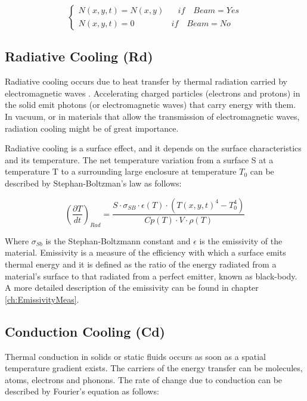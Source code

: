 \begin{equation}
    \begin{cases}
      N(x,y,t) = N(x,y) \mspace{30mu} if\mspace{18mu}Beam = Yes \\
      N(x,y,t) = 0 \mspace{80mu} if \mspace{18mu}Beam = No 
    \end{cases}
\end{equation}

\subsection{Radiative Cooling (Rd)}

Radiative cooling occurs due to heat transfer by thermal radiation carried by electromagnetic waves \parencite[][]{ref:RadiativeCooling}. Accelerating charged particles (electrons and protons) in the solid emit photons (or electromagnetic waves) that carry energy with them. In vacuum,  or in materials that allow the transmission of electromagnetic waves, radiation cooling might be of great importance. 

Radiative cooling is a surface effect, and it depends on the surface characteristics and its temperature.  The net temperature variation from a surface S at a temperature T to a surrounding large enclosure at temperature $T_0$ can be described by Stephan-Boltzman's law as follows: 

\begin{equation}
    \left( \frac{\partial T}{dt} \right)_{Rad} = \frac{S\cdot \sigma_{SB}\cdot \epsilon(T)\cdot \left(T(x,y,t)^4 - T_0^4\right)}{Cp(T)\cdot V \cdot \rho(T)}
\end{equation}

Where $\sigma_{Sb}$ is the Stephan-Boltzmann constant and $\epsilon$ is the emissivity of the material. Emissivity is a measure of the efficiency with which a surface emits thermal energy and it is defined as the ratio of the energy radiated from a material's surface to that radiated from a perfect emitter, known as black-body. A more detailed description of the emissivity can be found in chapter \ref{ch:EmissivityMeas}. 

\subsection{Conduction Cooling (Cd)}

Thermal conduction in solids or static fluids \parencite[][]{ref:ConductionCooling} occurs as soon as a spatial temperature gradient exists. The carriers of the energy transfer can be molecules, atoms, electrons and phonons. The rate of change due to conduction can be described by Fourier's equation as follows: 

